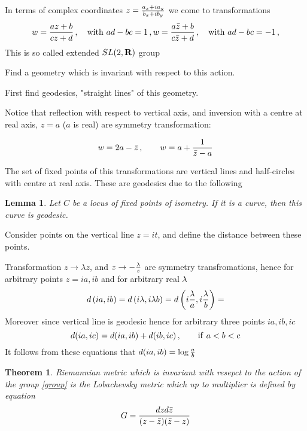 \documentclass[12pt]{article}
\newtheorem{theorem}{Theorem}
\newtheorem{lemma}{Lemma}
\theoremstyle{definition}
\numberwithin{equation}{section}
\begin{document}
 In terms of complex coordinates $z={a_x+ia_y\over b_x+ib_y}$
we come to transformations
       \begin{equation}\label{group}
 w={az+b\over cz+d}\,,\quad {\rm with}\,\,
   ad-bc=1\,, 
 w={a\bar z+b\over c\bar z+d}\,,\quad {\rm with}\,\,
   ad-bc=-1\,, 
       \end{equation}
This is so called extended $SL(2,{\bf R})$ group

Find a geometry  which is invariant with respect to this action.

First find geodesics, "straight lines" of this geometry.


Notice that reflection with respect
to vertical axis, and inversion with a 
centre at real axis,  $z=a$
($a$ is real) are symmetry transformation:

         $$
w=2a-\bar z\,,\qquad  
w=a+{1\over \bar z-a}
         $$

The set of fixed points of this transformations are
vertical lines and half-circles with centre at real axis.
These are geodesics due to the following 

\begin{lemma}
Let $C$ be a locus of fixed points of isometry.
If it is a curve, then this curve is geodesic.
\end{lemma}

Consider points on the vertical line $z=it$,
and define the distance between these points.

Transformation $z\to\lambda z$, and 
$z\to -{\lambda\over z}$ are symmetry transfromations,
hence for arbitrary points $z=ia,ib$
and for arbitrary real $\lambda$
   $$
d\left(ia,ib\right)=
d\left(i\lambda,i\lambda b\right)=
d\left(i{\lambda\over a},i{\lambda\over b}\right)=
   $$
Moreover since vertical line is geodesic hence
for arbitrary three points $ia,ib,ic$
      $$
   d(ia,ic)=d(ia,ib)+d(ib,ic)\,,\qquad
{\rm if}\,\, a<b<c
      $$
It follows from these equations that 
$d(ia,ib)=\log {a\over b}$

\begin{theorem}
Riemannian metric which is invariant with resepct to the
action of the group \eqref{group} is the Lobachevsky metric
which up to multiplier is defined
by equation
         $$
G={dz d\bar z\over (z-\bar z)(\bar z-z)}
       $$

\end{theorem}
\end{document}
